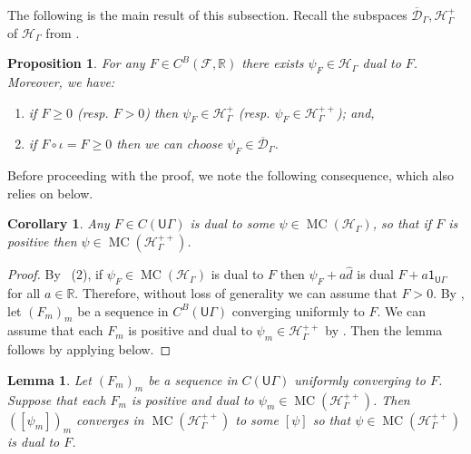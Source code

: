 \documentclass[twoside]{amsart}
\newtheorem{proposition}[theorem]{Proposition}
\newtheorem{corollary}[theorem]{Corollary}
\newtheorem{lemma}[theorem]{Lemma}
\theoremstyle{definition}
\numberwithin{equation}{section}
\numberwithin{theorem}{section}
\newcommand{\msf}[1]{\mathsf{#1}}
\newcommand{\R}{\mathbb{R}}
\newcommand{\calD}{\mathcal{D}}
\newcommand{\calF}{\mathcal{F}}
\newcommand{\calH}{\mathcal{H}}
\newcommand{\calQ}{\mathcal{Q}}
\newcommand{\scrH}{\mathscr{H}}
\newcommand{\G}{\Gamma}
\newcommand{\p}{\psi}
\newcommand{\ov}[1]{\overline{#1}}
\newcommand{\UG}{\msf{U}\G}
\DeclareMathOperator{\MC}{MC}
\begin{document}
The following is the main result of this subsection.
Recall the subspaces $\ov\calD_\G,\calH_\G^+$ of $\calH_\G$ from .

\begin{proposition}\label{prop.dictionaryBowen}
For any $F\in C^B(\calF,\R)$ there exists $\psi_F\in \calH_\G$ dual to $F$. Moreover, we have:
\begin{enumerate}
    \item if $F\geq 0$ (resp. $F>0$) then $\psi_F\in \calH_\G^{+}$ (resp. $\psi_F\in \calH_\G^{++}$); and,
    \item if $F \circ \iota=F \geq 0$ then we can choose $\psi_F \in \ov\calD_\G$.
\end{enumerate}
\end{proposition}

Before proceeding with the proof, we note the following consequence, which also relies on  below.

\begin{corollary}\label{coro:F->H}
Any $F\in C(\UG)$ is dual to some $\p\in \MC(\calH_\G)$, so that if $F$ is positive then $\p\in \MC(\calH_\G^{++})$.
\end{corollary}











\begin{proof}
By ~(2), if $\psi_F\in \MC(\calH_\G)$ is dual to $F$ then $\psi_F+a\hat d$ is dual $F+a \mathsf{1}_{\UG}$ for all $a\in \R$. Therefore, without loss of generality we can assume that $F>0$. By , let $(F_m)_m$ be a sequence in $C^B(\UG)$ converging uniformly to $F$. We can assume that each $F_m$ is positive and dual to $\p_m\in \calH_\G^{++}$ by . Then the lemma follows by applying  below. 
\end{proof}

\begin{lemma}\label{lem:convF}
    Let $(F_m)_m$ be a sequence in $C(\UG)$ uniformly converging to $F$. Suppose that each $F_m$ is positive and dual to $\p_m\in \MC(\calH_\G^{++})$. Then $([\p_m])_m$ converges in $\MC(\scrH_\G^{++})$ to some $[\p]$ so that $\p\in \MC(\calH_\G^{++})$ is dual to $F$.
\end{lemma}
\end{document}
